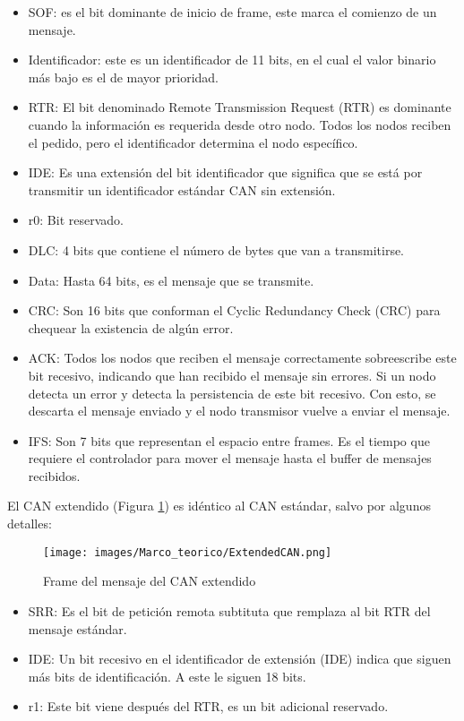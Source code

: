 \begin{itemize}
  \item SOF: es el bit dominante de inicio de frame, este marca el comienzo de un mensaje.
  \item Identificador: este es un identificador de 11 bits, en el cual el valor binario más bajo es el de mayor prioridad.
  \item RTR: El bit denominado Remote Transmission Request (RTR) es dominante cuando la información es requerida desde otro nodo.
    Todos los nodos reciben el pedido, pero el identificador determina el nodo específico.
  \item IDE: Es una extensión del bit identificador que significa que se está por transmitir un identificador estándar CAN sin extensión.
  \item r0: Bit reservado.
  \item DLC: 4 bits que contiene el  número de bytes que van a transmitirse.
  \item Data: Hasta 64 bits, es el mensaje que se transmite.
  \item CRC: Son 16 bits que conforman el Cyclic Redundancy Check (CRC) para chequear la existencia de algún error.
  \item ACK: Todos los nodos que reciben el mensaje correctamente sobreescribe este bit recesivo, indicando que han recibido el mensaje sin errores. Si un nodo detecta un error y detecta la persistencia de este bit recesivo. Con esto, se descarta el mensaje enviado y el nodo transmisor vuelve a enviar el mensaje.
  \item IFS: Son 7 bits que representan el espacio entre frames. Es el tiempo que requiere el controlador para mover el mensaje hasta el buffer de mensajes recibidos.
\end{itemize}

El CAN extendido (Figura \ref{fig:extendedCAN}) es idéntico al CAN estándar, salvo por algunos detalles:

\begin{figure}[h]
 \centering
 \texttt{[image: images/Marco\_teorico/ExtendedCAN.png]}
  \caption{Frame del mensaje del CAN extendido}
\label{fig:extendedCAN}
\end{figure}

\begin{itemize}
  \item SRR: Es el bit de petición remota subtituta que remplaza al bit RTR del mensaje estándar.
  \item IDE: Un bit recesivo en el identificador de extensión (IDE) indica que siguen más bits de identificación. A este le siguen 18 bits.
  \item r1: Este bit viene después del RTR, es un bit adicional reservado.
\end{itemize}

